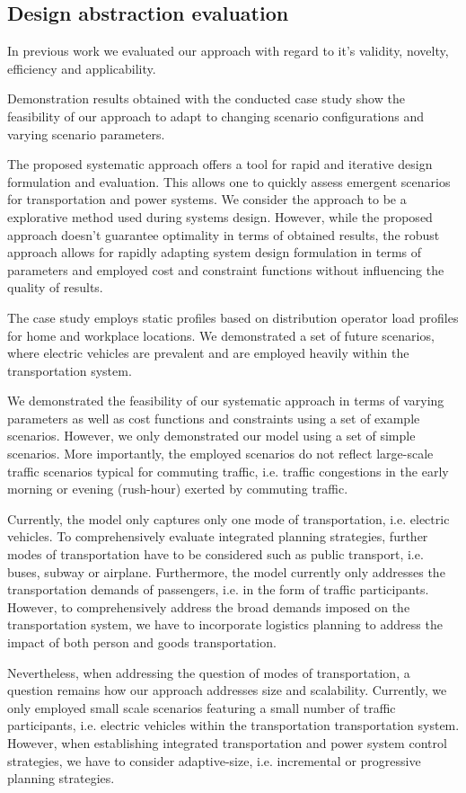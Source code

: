 \subsection{Design abstraction evaluation}
\label{discussion}
In previous work \cite{ascher2015integrated} we evaluated our approach with regard to it's validity, novelty, efficiency and applicability. 

Demonstration results obtained with the conducted case study show the feasibility of our approach to adapt to changing scenario configurations and varying scenario parameters.

The proposed systematic approach offers a tool for rapid and iterative design formulation and evaluation. This allows one to quickly assess emergent scenarios for transportation and power systems. We consider the approach to be a explorative method used during systems design. However, while the proposed approach doesn't guarantee optimality in terms of obtained results, the robust approach allows for rapidly adapting system design formulation in terms of parameters and employed cost and constraint functions without influencing the quality of results. 

The case study employs static profiles based on distribution operator load profiles for home and workplace locations. We demonstrated a set of future scenarios, where electric vehicles are prevalent and are employed heavily within the transportation system. 


We demonstrated the feasibility of our systematic approach in terms of varying parameters as well as cost functions and constraints using a set of example scenarios.
However, we only demonstrated our model using a set of simple scenarios. More importantly, the employed scenarios do not reflect large-scale traffic scenarios typical for commuting traffic, i.e. traffic congestions in the early morning or evening (rush-hour) exerted by commuting traffic.

Currently, the model only captures only one mode of transportation, i.e. electric vehicles. To comprehensively evaluate integrated planning strategies, further modes of transportation have to be considered such as public transport, i.e. buses, subway or airplane. Furthermore, the model currently only addresses the transportation demands of passengers, i.e. in the form of traffic participants. However, to comprehensively address the broad demands imposed on the transportation system, we have to incorporate logistics planning to address the impact of both person and goods transportation. 

Nevertheless, when addressing the question of modes of transportation, a question remains how our approach addresses size and scalability. Currently, we only employed small scale scenarios featuring a small number of traffic participants, i.e. electric vehicles within the transportation transportation system. However, when establishing integrated transportation and power system control strategies, we have to consider adaptive-size, i.e. incremental or progressive planning strategies.
